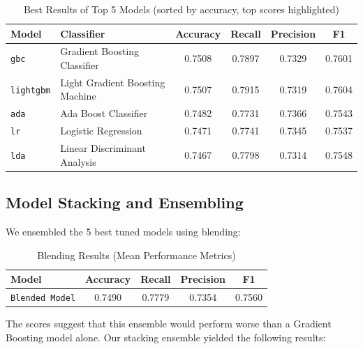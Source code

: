 \documentclass[a4paper,12pt]{article}
\begin{document}
\begin{table}[H]
\centering
\begin{tabular}{l l c c c c}
\toprule
\textbf{Model} & \textbf{Classifier} & \textbf{Accuracy} & \textbf{Recall} & \textbf{Precision} & \textbf{F1} \\
\midrule
\texttt{gbc}    & Gradient Boosting Classifier & \cellcolor{yellow}0.7508 & 0.7897 & 0.7329 & 0.7601 \\  %
\texttt{lightgbm} & Light Gradient Boosting Machine & 0.7507 & \cellcolor{yellow}0.7915 & 0.7319 & \cellcolor{yellow}0.7604 \\  %
\texttt{ada} & Ada Boost Classifier & 0.7482 & 0.7731 & \cellcolor{yellow}0.7366 & 0.7543 \\ %
\texttt{lr} & Logistic Regression & 0.7471 & 0.7741 & 0.7345 & 0.7537 \\  %
\texttt{lda} & Linear Discriminant Analysis & 0.7467 & 0.7798 & 0.7314 & 0.7548 \\ %
\bottomrule
\end{tabular}
\caption{Best Results of Top 5 Models (sorted by accuracy, top scores highlighted)}
\label{tab:best_model_performance}
\end{table}

\subsection{Model Stacking and Ensembling}

We ensembled the 5 best tuned models using blending:

\begin{table}[H]
    \centering
    \begin{tabular}{l c c c c}
    \toprule
    \textbf{Model} & \textbf{Accuracy} & \textbf{Recall} & \textbf{Precision} & \textbf{F1} \\
    \midrule
    \texttt{Blended Model} & 0.7490 & 0.7779 & 0.7354 & 0.7560 \\
    \bottomrule
    \end{tabular}
    \caption{Blending Results (Mean Performance Metrics)}
    \label{tab:blending_performance}
\end{table}

The scores suggest that this ensemble would perform worse than a Gradient Boosting model alone.
Our stacking ensemble yielded the following results:
\end{document}
